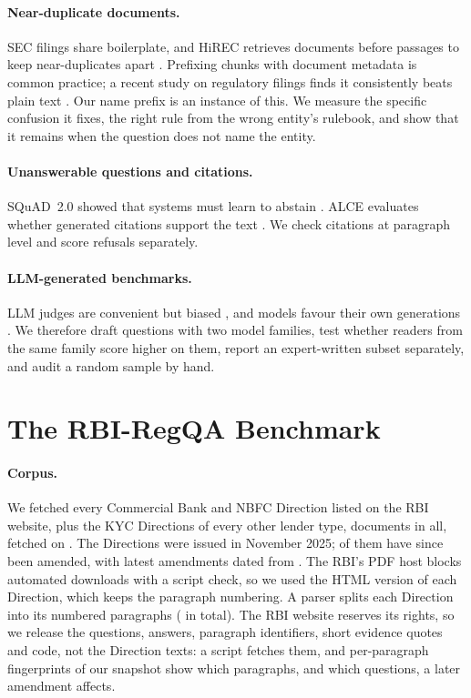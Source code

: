 \documentclass[11pt]{article}
\begin{document}
\paragraph{Near-duplicate documents.} SEC filings share boilerplate, and HiREC retrieves documents before passages to keep near-duplicates apart \citep{choe2025hirec}. Prefixing chunks with document metadata is common practice; a recent study on regulatory filings finds it consistently beats plain text \citep{yousuf2026metadata}. Our name prefix is an instance of this. We measure the specific confusion it fixes, the right rule from the wrong entity's rulebook, and show that it remains when the question does not name the entity.

\paragraph{Unanswerable questions and citations.} SQuAD~2.0 showed that systems must learn to abstain \citep{rajpurkar2018squad2}. ALCE evaluates whether generated citations support the text \citep{gao2023alce}. We check citations at paragraph level and score refusals separately.

\paragraph{LLM-generated benchmarks.} LLM judges are convenient but biased \citep{zheng2023judge}, and models favour their own generations \citep{panickssery2024selfpref}. We therefore draft questions with two model families, test whether readers from the same family score higher on them, report an expert-written subset separately, and audit a random sample by hand.

\section{The RBI-RegQA Benchmark}

\paragraph{Corpus.} We fetched every Commercial Bank and NBFC Direction listed on the RBI website, plus the KYC Directions of every other lender type, \NDocs{} documents in all, fetched on \SnapshotDate{}. The Directions were issued in November 2025; \NUpdated{} of them have since been amended, with latest amendments dated from \UpdateRange{}. The RBI's PDF host blocks automated downloads with a script check, so we used the HTML version of each Direction, which keeps the paragraph numbering. A parser splits each Direction into its numbered paragraphs (\NParas{} in total). The RBI website reserves its rights, so we release the questions, answers, paragraph identifiers, short evidence quotes and code, not the Direction texts: a script fetches them, and per-paragraph fingerprints of our snapshot show which paragraphs, and which questions, a later amendment affects.
\end{document}
